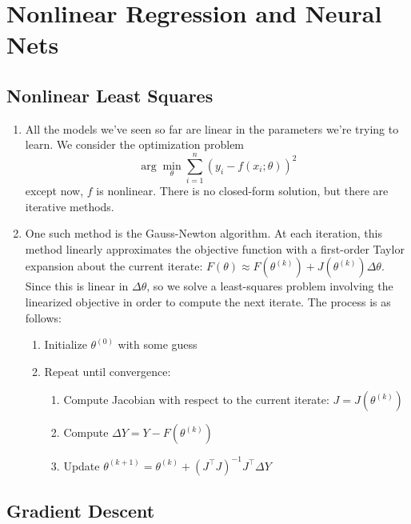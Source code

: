 \documentclass[10pt]{article}
\begin{document}
\begin{multicols}{2}
\begin{addmargin}[0.8em]{0.5em}
\end{addmargin}

\section{Nonlinear Regression and Neural Nets}
\begin{addmargin}[0.8em]{0.5em}

    \subsection{Nonlinear Least Squares}
    \begin{enumerate}[label=(\alph*)]
        \item All the models we’ve seen so far are linear in the parameters we’re trying to learn. We consider the optimization problem
        $$
        \arg\min_{\theta} \sum_{i=1}^n (y_i - f(x_i; \theta))^2
        $$
        except now, $f$ is nonlinear. There is no closed-form solution, but there are iterative methods.
        \item One such method is the Gauss-Newton algorithm. At each iteration, this method linearly approximates the objective function with a first-order Taylor expansion about the current iterate: $F(\theta) \approx F(\theta^{(k)}) + J(\theta^{(k)}) \Delta \theta$.
        Since this is linear in $\Delta \theta$, so we solve a least-squares problem involving the linearized objective in order to compute the next iterate. 
        The process is as follows:
        \begin{enumerate}[1.]
        \item Initialize $\theta^{(0)}$ with some guess
        \item Repeat until convergence:
        \begin{enumerate}
        \item Compute Jacobian with respect to the current iterate: $J = J(\theta^{(k)})$
        \item Compute $\Delta Y = Y - F(\theta^{(k)})$ 
        \item Update $\theta^{(k+1)} = \theta^{(k)} + (J^\top J)^{-1} J^\top \Delta Y$
        \end{enumerate}
        \end{enumerate}
    \end{enumerate}  

    \subsection{Gradient Descent}


\end{addmargin}
\end{multicols}
\end{document}
